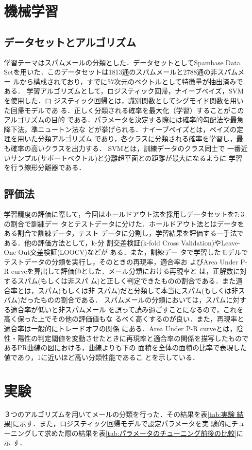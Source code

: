 \documentclass[a4paper,12pt]{jarticle}
\begin{document}
\section{機械学習}
\subsection{データセットとアルゴリズム}
学習テーマはスパムメールの分類とした．データセットとしてSpambase Data
Setを用いた．このデータセットは1813通のスパムメールと2788通の非スパムメー
ルから構成されており，すでに57次元のベクトルとして特徴量が抽出済みである．
学習アルゴリズムとして，ロジスティック回帰，ナイーブベイズ，SVMを使用した．ロ
ジスティック回帰とは，識別関数としてシグモイド関数を用いた回帰モデルであ
る．正しく分類される確率を最大化（学習）することがこのアルゴリズムの目的
である．パラメータを決定する際には確率的勾配法や最急降下法，準ニュートン法な
どが挙げられる．ナイーブベイズとは，ベイズの定理を用いた分類アルゴリズム
であり，各クラスに分類される確率を学習し，最も確率の高いクラスを出力する．
SVMとは，訓練データのクラス同士で
一番近いサンプル(サポートベクトル)と分離超平面との距離が最大になるように
学習を行う線形分離器である．

\subsection{評価法}
学習精度の評価に際して，今回はホールドアウト法を採用しデータセットを$7:3$の割合で訓練デー
タとテストデータに分けた．ホールドアウト法とはデータをある割合で訓練データ，テスト
データに分割し，学習結果を評価する一手法である．他の評価方法として，k-分
割交差検証(k-fold Cross Validation)やLeave-One-Out交差検証(LOOCV)などが
ある．また，訓練デー
タで学習したモデルでテストデータの分類を実行し，そのときの再現率，適合率お
よびArea Under P-R curveを算出して評価値とした．メール分類における再現率と
は，正解数に対するスパム(もしくは非スパ
ム)と正しく判定できたものの割合である．また適合率とは，スパム(もしくは非
スパム)だと分類して本当にスパム(もしくは非スパム)だったものの割合である．
スパムメールの分類においては，スパムに対する適合率が低いと非スパムメール
を誤って読み過ごすことになるので，これを高く保った上でその他の評価値もな
るべく高くするのが良い．また，再現率と適合率は一般的にトレードオフの関係
にある．Area Under P-R curveとは，陰性・陽性の判定閾値を変動させたときに再現率と適合率の関係を描写したものであるPR曲線の図における，曲線よりも下の
面積を全体の面積の比率で表現した値であり，1に近いほど高い分類性能であるこ
とを示している．

\section{実験}
３つのアルゴリズムを用いてメールの分類を行った．その結果を表\ref{tab:実験
結果}に示す．また，ロジスティック回帰モデルで設定パラメータを実
験的にチューニングして求めた際の結果を表\ref{tab:パラメータのチューニング前後の比較}に示
す．
\end{document}
